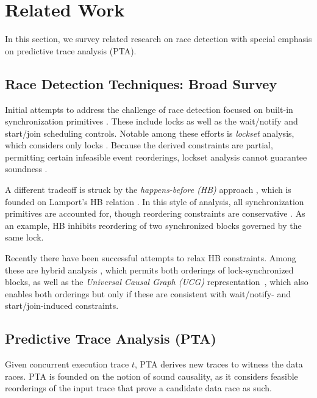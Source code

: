 \section{Related Work}

In this section, we survey related research on race detection with special emphasis on predictive trace analysis (PTA).

\subsection{Race Detection Techniques: Broad Survey} 

Initial attempts to address the challenge of race detection focused on built-in synchronization primitives \cite{eraser,SasturkarAWS05,vonPraun:2001,Choi:2002}. These include locks as well as the wait/notify and start/join scheduling controls. Notable among these efforts is \emph{lockset} analysis, which considers only locks \cite{eraser}. Because the derived constraints are partial, permitting certain infeasible event reorderings, lockset analysis cannot guarantee soundness \cite{Naik:2006}. 

A different tradeoff is struck by the \emph{happens-before (HB)} approach \cite{Christiaens,Dinning:1990,Mellor-Crummey:1991}, which is founded on Lamport's HB relation \cite{Lamport}. In this style of analysis, all synchronization primitives are accounted for, though reordering constraints are conservative . As an example, HB inhibits reordering of two synchronized blocks governed by the same lock. 


Recently there have been successful attempts to relax HB constraints. Among these are hybrid analysis \cite{hybrid}, which permits both orderings of lock-synchronized blocks, as well as the \emph{Universal Causal Graph (UCG)} representation~\cite{ucg}, which also enables both orderings but only if these are consistent with wait/notify- and start/join-induced constraints.

\subsection{Predictive Trace Analysis (PTA)}

Given concurrent execution trace $t$, PTA derives new traces to witness the data races. PTA is founded on the notion of sound causality, as it considers feasible reorderings of the input trace that prove a candidate data race as such. 

